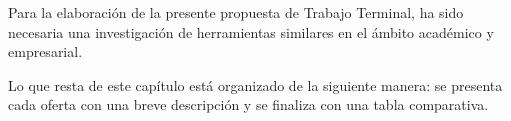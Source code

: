 Para la elaboración de la presente propuesta de Trabajo Terminal, ha sido necesaria una investigación de herramientas similares en el ámbito académico y empresarial.


Lo que resta de este capítulo está organizado de la siguiente manera: se presenta cada oferta con una breve descripción y se finaliza con una tabla comparativa.







%


